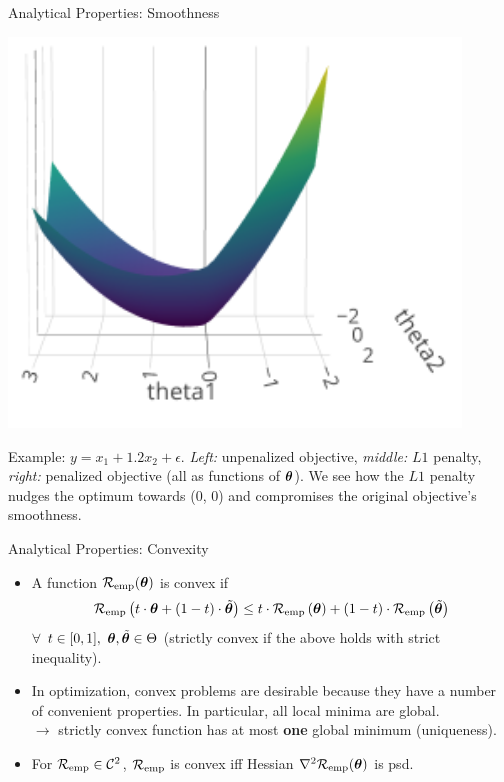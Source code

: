 \documentclass[11pt,compress,t,notes=noshow, xcolor=table]{beamer}
\begin{document}
\begin{vbframe}{Analytical Properties: Smoothness}
\begin{minipage}[c]{0.3\textwidth}
  \includegraphics[width=0.9\textwidth]{figure/lasso_penalized}
\end{minipage}%

\tiny Example: $y = x_1 + 1.2 x_2 + \epsilon$. \textit{Left:} unpenalized 
objective, \textit{middle:} $L1$ penalty, \textit{right:} penalized objective 
(all as functions of $\bm{\theta}$). We see how the $L1$ penalty nudges the optimum 
towards (0, 0) and compromises the original objective's smoothness.

\end{vbframe}


\begin{vbframe}{Analytical Properties: Convexity}

\begin{itemize}
  \setlength\itemsep{1.2em}
  \item A function $\mathcal{R}_{\text{emp}}(\bm{\theta})$ is convex if
  $$
  \mathcal{R}_{\text{emp}}\left(t \cdot \bm{\theta} + (1 - t) \cdot \tilde {\bm{\theta}}\right) \le t \cdot
  \mathcal{R}_{\text{emp}}\left(\bm{\theta}\right) + (1 - t) \cdot \mathcal{R}_{\text{emp}}\left(\tilde {\bm{\theta}} \right)
  $$
  $\forall$ $t \in [0, 1], ~\bm{\theta}, \tilde {\bm{\theta}} \in \Theta$
  (strictly convex if the above holds with strict inequality).
  \item In optimization, convex problems are desirable because they have a number of convenient properties. In particular, all local minima are 
  global. \vspace{0.2cm }\\
  $\rightarrow$ strictly convex function has at most 
  \textbf{one} global minimum (uniqueness).
  \item For $\mathcal{R}_{\text{emp}} \in \mathcal{C}^{2}$, $\mathcal{R}_{\text{emp}}$ is convex iff Hessian $\nabla^2 \mathcal{R}_{\text{emp}}(\bm{\theta})$ is psd.
\end{itemize}

\end{vbframe}
\end{document}
